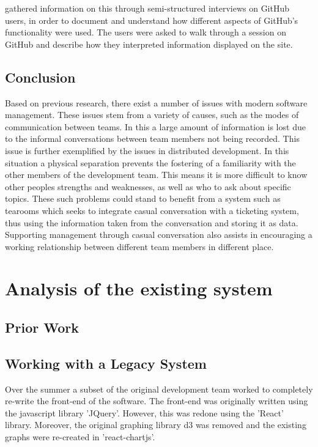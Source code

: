 \documentclass{l4proj}
\begin{document}
\citet{dabbish12social} gathered information on this through semi-structured interviews on GitHub users, in order to document and understand how different aspects of GitHub's functionality were used.  The users were asked to walk through a session on GitHub and describe how they interpreted information displayed on the site.


\section{Conclusion}

Based on previous research, there exist a number of issues with modern software management.  These issues stem from a variety of causes, such as the modes of communication between teams.  In this a large amount of information is lost due to the informal conversations between team members not being recorded.  This issue is further exemplified by the issues in distributed development.  In this situation a physical separation prevents the fostering of a familiarity with the other members of the development team.  This means it is more difficult to know other peoples strengths and weaknesses, as well as who to ask about specific topics. These such problems could stand to benefit from a system such as tearooms which seeks to integrate casual conversation with a ticketing system, thus using the information taken from the conversation and storing it as data.  Supporting management through casual conversation also assists in encouraging a working relationship between different team members in different place.

\chapter{Analysis of the existing system}

\section{Prior Work}

\section{Working with a Legacy System}

Over the summer a subset of the original development team worked to completely re-write the front-end of the software.  The front-end was originally written using the javascript library 'JQuery'.  However, this was redone using the 'React' library.  Moreover, the original graphing library d3 was removed and the existing graphs were re-created in 'react-chartjs'.
\end{document}
